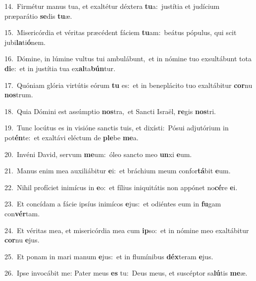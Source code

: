 {\numbfont\textcolor{\numbcolor}{14.}}~Firmétur manus tua, et exaltétur déxtera \textbf{tu}\-a:~\star justítia et judícium præparátio \textbf{se}\-dis \textbf{tu}\-æ.\par
{\numbfont\textcolor{\numbcolor}{15.}}~Misericórdia et véritas præcédent fáciem \textbf{tu}\-am:~\star beátus pópulus, qui scit jubi\-\textbf{la}\-ti\-\textbf{ó}\-nem.\par
{\numbfont\textcolor{\numbcolor}{16.}}~Dómine, in lúmine vultus tui ambulábunt,~\dagger et in nómine tuo exsultábunt tota \textbf{di}\-e:~\star et in justítia tua ex\-\textbf{al}\-ta\-\textbf{bún}\-tur.\par
{\numbfont\textcolor{\numbcolor}{17.}}~Quóniam glória virtútis eórum \textbf{tu} es:~\star et in beneplácito tuo exaltábitur \textbf{cor}\-nu \textbf{nos}\-trum.\par
{\numbfont\textcolor{\numbcolor}{18.}}~Quia Dómini est assúmptio \textbf{nos}\-tra,~\star et Sancti Israël, \textbf{re}\-gis \textbf{nos}\-tri.\par
{\numbfont\textcolor{\numbcolor}{19.}}~Tunc locútus es in visióne sanctis tuis, et dixísti:~\dagger Pósui adjutórium in pot\-\textbf{én}\-te:~\star et exaltávi eléctum de \textbf{ple}\-be \textbf{me}\-a.\par
{\numbfont\textcolor{\numbcolor}{20.}}~Invéni David, servum \textbf{me}\-um:~\star óleo sancto meo \textbf{un}\-xi \textbf{e}\-um.\par
{\numbfont\textcolor{\numbcolor}{21.}}~Manus enim mea auxiliábitur \textbf{e}\-i:~\star et bráchium meum confor\-\textbf{tá}\-bit \textbf{e}\-um.\par
{\numbfont\textcolor{\numbcolor}{22.}}~Nihil profíciet inimícus in \textbf{e}\-o:~\star et fílius iniquitátis non appónet no\-\textbf{cé}\-re \textbf{e}\-i.\par
{\numbfont\textcolor{\numbcolor}{23.}}~Et concídam a fácie ipsíus inimícos \textbf{e}\-jus:~\star et odiéntes eum in \textbf{fu}\-gam con\-\textbf{vér}\-tam.\par
{\numbfont\textcolor{\numbcolor}{24.}}~Et véritas mea, et misericórdia mea cum \textbf{ip}\-so:~\star et in nómine meo exaltábitur \textbf{cor}\-nu \textbf{e}\-jus.\par
{\numbfont\textcolor{\numbcolor}{25.}}~Et ponam in mari manum \textbf{e}\-jus:~\star et in flumínibus \textbf{déx}\-teram \textbf{e}\-jus.\par
{\numbfont\textcolor{\numbcolor}{26.}}~Ipse invocábit me: Pater meus \textbf{es} tu:~\star Deus meus, et suscéptor sa\-\textbf{lú}\-tis \textbf{me}\-æ.\par
